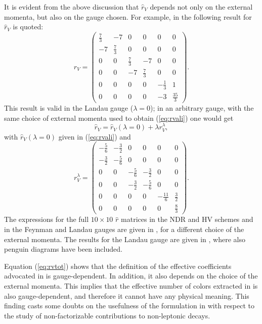  It is evident from the above discussion that $\hat r_V$  
depends not only on the
external momenta, but also on the gauge chosen.   
For example, in \cite{GNF,AKL98} the following result for $\hat r_V$ is
quoted:
\begin{equation}
  \label{eq:rvali}
  \hat r_V=\left(
    \begin{array}{cccccc}
      \frac{7}{3} & - 7 & 0 & 0 & 0 & 0\\
      - 7 & \frac{7}{3} & 0 & 0 & 0 & 0\\ 
      0 & 0 & \frac{7}{3} & - 7 & 0 & 0\\ 
      0 & 0 & - 7 & \frac{7}{3} & 0 & 0\\ 
      0 & 0 & 0 & 0 & - \frac{1}{3} & 1\\ 
      0 & 0 & 0 & 0 & - 3 & \frac{35}{3} 
    \end{array}
    \right).
\end{equation}
This result is valid in the Landau gauge ($\lambda=0$); 
in an arbitrary gauge, with the same choice of external momenta used
to obtain (\ref{eq:rvali}) one would get
\begin{equation}
  \label{eq:rvtot}
  \hat r_V = \hat r_V (\lambda=0) + \lambda r_V^\lambda,
\end{equation}
with $\hat r_V (\lambda=0)$ given in (\ref{eq:rvali}) and
\begin{equation}
  \label{eq:rvluca}
  r_V^\lambda=\left(
    \begin{array}{cccccc}
      - \frac{5}{6} & - \frac{3}{2} & 0 & 0 & 0 & 0\\
      - \frac{3}{2} & - \frac{5}{6} & 0 & 0 & 0 & 0\\
      0 & 0 & - \frac{5}{6} & - \frac{3}{2} & 0 & 0\\ 
      0 & 0 & - \frac{3}{2} & - \frac{5}{6} & 0 & 0\\ 
      0 & 0 & 0 & 0 & - \frac{11}{6} & \frac{3}{2}\\
      0 & 0 & 0 & 0 & 0 & \frac{8}{3}
    \end{array}
    \right).
\end{equation}
The expressions for the full 
$10 \times 10$ $\hat r$ matrices in the
NDR and HV schemes and in the Feynman and Landau gauges are given in
\cite{rome2}, for a different choice of the external momenta.
The results for the Landau gauge are given in \cite{BJLW1}, where
also penguin diagrams have been included.

Equation (\ref{eq:rvtot}) shows that the definition of the effective
coefficients advocated in \cite{Cheng,GNF,AKL98}
is gauge-dependent. In addition, it also depends on the choice of the
external momenta.
This implies that the effective number of colors extracted in
\cite{Cheng,GNF,AKL98} is also gauge-dependent, and therefore it
cannot have any physical meaning. 
This finding casts some doubts on the
usefulness of the formulation in \cite{Cheng,GNF,AKL98} with respect
to the study of non-factorizable contributions to non-leptonic decays.

